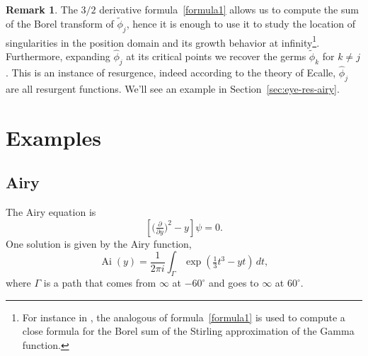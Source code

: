 \documentclass{article}
\theoremstyle{definition}
\newcommand{\series}[1]{\tilde{#1}}
\DeclareMathOperator{\Ai}{Ai}
\newtheorem{remark}[definition]{Remark}
\begin{document}
\begin{remark}
    The $3/2$ derivative formula~\eqref{formula1} allows us to compute the sum of the Borel transform of $\series{\phi}_j$, hence it is enough to use it to study the location of singularities in the position domain and its growth behavior at infinity\footnote{For instance in \cite{sauzin2021variations}, the analogous of formula~\eqref{formula1} is used to compute a close formula for the Borel sum of the Stirling approximation of the Gamma function.}. Furthermore, expanding $\hat{\phi}_j$ at its critical points we recover the germs $\series{\phi}_k$ for $k\neq j$. This is an instance of resurgence, indeed according to the theory of Ecalle, $\hat{\phi}_j$ are all resurgent functions. We'll see an example in Section~\ref{sec:eye-res-airy}. 
\end{remark}


\section{Examples}\label{sec:examples}

\subsection{Airy}

The Airy equation is
\begin{equation}\label{eqn:airy}
\left[\big(\tfrac{\partial}{\partial y}\big)^2 - y\right] \psi = 0.
\end{equation}
One solution is given by the Airy function,
\[ \Ai(y) = \frac{1}{2\pi i} \int_{\Gamma} \exp\left(\tfrac{1}{3}t^3 - yt\right)\,dt, \]
where $\Gamma$ is a path that comes from $\infty$ at $-60^\circ$ and goes to $\infty$ at $60^\circ$.
\end{document}
